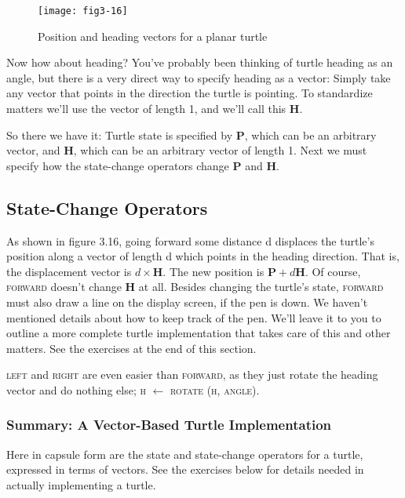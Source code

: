 \documentclass{book}
\begin{document}
\begin{figure}
\begin{center}
\texttt{[image: fig3-16]}
\caption{Position and heading vectors for a planar turtle}
\end{center}
\end{figure}

Now how about heading? You've probably been thinking of turtle
heading as an angle, but there is a very direct way to specify heading as
a vector: Simply take any vector that points in the direction the turtle
is pointing. To standardize matters we'll use the vector of length 1, and
we'll call this \textbf{H}.

So there we have it: Turtle state is specified by \textbf{P}, which can be an
arbitrary vector, and \textbf{H}, which can be an arbitrary vector of length 1.
Next we must specify how the state-change operators change \textbf{P} and \textbf{H}.

\subsection{State-Change Operators}

As shown in figure 3.16, going forward some distance d displaces the
turtle's position along a vector of length d which points in the heading
direction. That is, the displacement vector is $d \times \mathbf{H}$. The new position is
$\mathbf{P} + d\mathbf{H}$. Of course, \textsc{forward} doesn't change \textbf{H} at all. Besides changing
the turtle's state, \textsc{forward} must also draw a line on the display screen,
if the pen is down. We haven't mentioned details about how to keep
track of the pen. We'll leave it to you to outline a more complete
turtle implementation that takes care of this and other matters. See
the exercises at the end of this section.

\textsc{left} and \textsc{right} are even easier than \textsc{forward}, as they just rotate the
heading vector and do nothing else; \textsc{h} $\leftarrow$ \textsc{rotate} (\textsc{h}, \textsc{angle}).

\subsubsection{Summary: A Vector-Based Turtle Implementation}

Here in capsule form are the state and state-change operators for a turtle,
expressed in terms of vectors. See the exercises below for details needed
in actually implementing a turtle.
\end{document}
